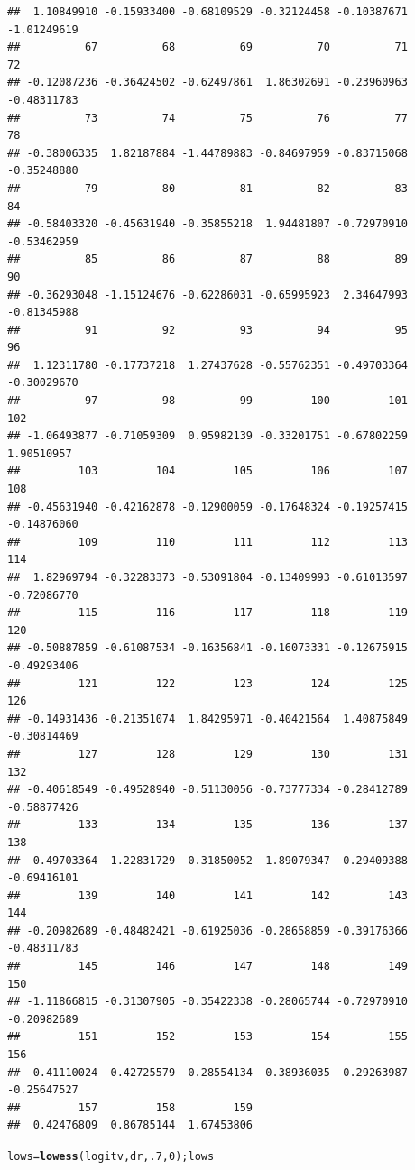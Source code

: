 \documentclass{article}\usepackage[]{graphicx}\usepackage[]{color}
\makeatletter
\newcommand{\hlnum}[1]{\textcolor[rgb]{0.686,0.059,0.569}{#1}}%
\newcommand{\hlstd}[1]{\textcolor[rgb]{0.345,0.345,0.345}{#1}}%
\newcommand{\hlkwb}[1]{\textcolor[rgb]{0.69,0.353,0.396}{#1}}%
\newcommand{\hlkwd}[1]{\textcolor[rgb]{0.737,0.353,0.396}{\textbf{#1}}}%
\newenvironment{kframe}{%
 \def\at@end@of@kframe{}%
 \ifinner\ifhmode%
  \def\at@end@of@kframe{\end{minipage}}%
  \begin{minipage}{\columnwidth}%
 \fi\fi%
 \def\FrameCommand##1{\hskip\@totalleftmargin \hskip-\fboxsep
 \colorbox{shadecolor}{##1}\hskip-\fboxsep
     \hskip-\linewidth \hskip-\@totalleftmargin \hskip\columnwidth}%
 \MakeFramed {\advance\hsize-\width
   \@totalleftmargin\z@ \linewidth\hsize
   \@setminipage}}%
 {\par\unskip\endMakeFramed%
 \at@end@of@kframe}
\newenvironment{knitrout}{}{} %
\makeatother
\begin{document}
\begin{enumerate}[(a)]
\begin{knitrout}
\begin{kframe}
\begin{verbatim}
##  1.10849910 -0.15933400 -0.68109529 -0.32124458 -0.10387671 -1.01249619 
##          67          68          69          70          71          72 
## -0.12087236 -0.36424502 -0.62497861  1.86302691 -0.23960963 -0.48311783 
##          73          74          75          76          77          78 
## -0.38006335  1.82187884 -1.44789883 -0.84697959 -0.83715068 -0.35248880 
##          79          80          81          82          83          84 
## -0.58403320 -0.45631940 -0.35855218  1.94481807 -0.72970910 -0.53462959 
##          85          86          87          88          89          90 
## -0.36293048 -1.15124676 -0.62286031 -0.65995923  2.34647993 -0.81345988 
##          91          92          93          94          95          96 
##  1.12311780 -0.17737218  1.27437628 -0.55762351 -0.49703364 -0.30029670 
##          97          98          99         100         101         102 
## -1.06493877 -0.71059309  0.95982139 -0.33201751 -0.67802259  1.90510957 
##         103         104         105         106         107         108 
## -0.45631940 -0.42162878 -0.12900059 -0.17648324 -0.19257415 -0.14876060 
##         109         110         111         112         113         114 
##  1.82969794 -0.32283373 -0.53091804 -0.13409993 -0.61013597 -0.72086770 
##         115         116         117         118         119         120 
## -0.50887859 -0.61087534 -0.16356841 -0.16073331 -0.12675915 -0.49293406 
##         121         122         123         124         125         126 
## -0.14931436 -0.21351074  1.84295971 -0.40421564  1.40875849 -0.30814469 
##         127         128         129         130         131         132 
## -0.40618549 -0.49528940 -0.51130056 -0.73777334 -0.28412789 -0.58877426 
##         133         134         135         136         137         138 
## -0.49703364 -1.22831729 -0.31850052  1.89079347 -0.29409388 -0.69416101 
##         139         140         141         142         143         144 
## -0.20982689 -0.48482421 -0.61925036 -0.28658859 -0.39176366 -0.48311783 
##         145         146         147         148         149         150 
## -1.11866815 -0.31307905 -0.35422338 -0.28065744 -0.72970910 -0.20982689 
##         151         152         153         154         155         156 
## -0.41110024 -0.42725579 -0.28554134 -0.38936035 -0.29263987 -0.25647527 
##         157         158         159 
##  0.42476809  0.86785144  1.67453806
\end{verbatim}
\begin{alltt}
  \hlstd{lows} \hlkwb{=} \hlkwd{lowess}\hlstd{(logitv, dr,} \hlnum{.7}\hlstd{,} \hlnum{0}\hlstd{);lows}

\end{alltt}
\end{kframe}
\end{knitrout}
\end{enumerate}
\end{document}
